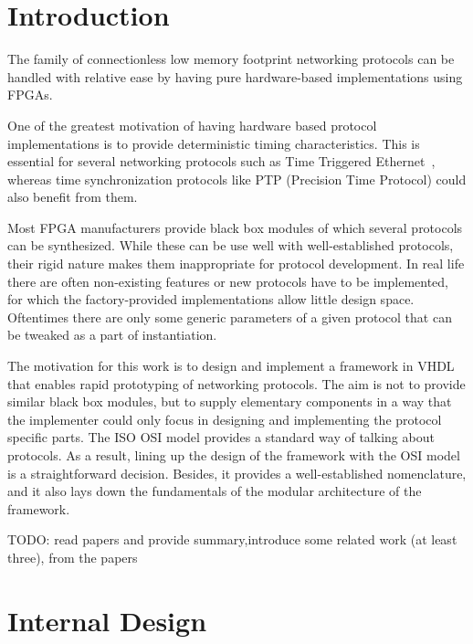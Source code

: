 \documentclass[conference]{IEEEtran}
\begin{document}
\section{Introduction}\label{sec:Motivation}

The family of connectionless low memory footprint networking protocols can be handled with relative ease by having pure hardware-based implementations using FPGAs.

One of the greatest motivation of having hardware based protocol implementations is to provide deterministic timing characteristics. This is essential for several networking protocols such as Time Triggered Ethernet~\cite{SAE_AS6802}, whereas time synchronization protocols like PTP (Precision Time Protocol) \cite{PTP_standard}could also benefit from them.

Most FPGA manufacturers provide black box modules of which several protocols can be synthesized. While these can be use well with well-established protocols, their rigid nature makes them inappropriate for protocol development. In real life there are often non-existing features
or new protocols have to be implemented, for which the factory-provided implementations allow little design space. Oftentimes there are only some generic parameters of a given protocol that can be tweaked as a part of instantiation.

The motivation for this work is to design and implement a framework in VHDL that enables rapid prototyping of networking protocols. The aim is not to provide similar black box modules, but to supply elementary components in a way that the implementer could only focus in designing and implementing the protocol specific parts. The ISO OSI model provides a standard way of talking about protocols. As a result, lining up the design of the framework with the OSI model is a straightforward decision. Besides, it provides a well-established nomenclature, and it also lays down the fundamentals of the modular architecture of the framework.


TODO: read papers and provide summary,introduce some related work (at least three), from the papers 

\section{Internal Design}\label{sec:Internal Design}
\end{document}
